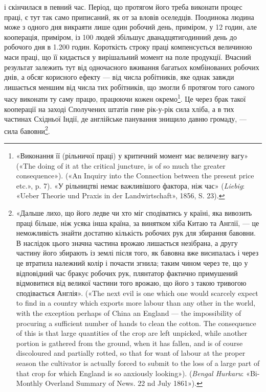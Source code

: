 \parcont{}  %
і скінчилася в певний час. Період, що протягом його треба виконати
процес праці, є тут так само приписаний, як от за вловів
оселедців. Поодинока людина може з одного дня викраяти лише
один робочий день, приміром, у 12 годин, але кооперація, приміром,
із 100 людей збільшує дванадцятигодинний день до робочого
дня в \num{1.200} годин. Короткість строку праці компенсується
величиною маси праці, що її кидається у вирішальний момент
на поле продукції. Вчасний результат залежить тут від одночасного
вживання багатьох комбінованих робочих днів, а обсяг
корисного ефекту — від числа робітників, яке однак завжди
лишається меншим від числа тих робітників, що змогли б протягом
того самого часу виконати ту саму працю, працюючи кожен
окремо\footnote{
«Виконання її (рільничої праці) у критичний момент має величезну
вагу» («The doing of it at the critical juncture, is of so much the
greater consequence»). («An Inquiry into the Connection between the present
price etc.», p. 7). «У рільництві немає важливішого фактора, ніж час»
(\emph{Liebig}: «Ueber Theorie und Praxis in der Landwirtschaft», 1856, S. 23).
}. Це через брак такої кооперації на заході Сполучених
штатів гине рік-у-рік сила хліба, а в тих частинах Східньої
Індії, де англійське панування знищило давню громаду, — сила
бавовни\footnote{
«Дальше лихо, що його ледве чи хто міг сподіватись у країні,
яка вивозить праці більше, ніж усяка інша країна, за винятком хіба
Китаю та Англії, — це неможливість знайти достатню кількість робочих
рук для збирання бавовни. В наслідок цього значна частина врожаю лишається
незібрана, а другу частину його збирають із землі після того, як
бавовна вже висипалась і через це втратила належний колір і почасти
згнила; таким чином через те, що у відповідний час бракує робочих рук,
плянтатор фактично примушений відмовитися від великої частини того
врожаю, що його з такою тривогою сподівається Англія». («The next
evil is one which one would scarcely expect to find in a country which exports
more labour than any other in the world, with the exception perhaps of
China an England — the impossibility of procuring a sufficient number of
hands to clean the cotton. The consequence of this is that large quantities of
the crop are left unpicked, while another portion is gathered from the ground,
when it has fallen, and is of course discoloured and partially rotted, so
that for want of labour at the proper season the cultivator is actually forced
to submit to the loss of a large part of that crop for which England is so
anxiously looking»). (\emph{Bengal Hurkaru}: «Bi-Monthly Overland Summary
of News. 22 nd July 1861»).
}.

